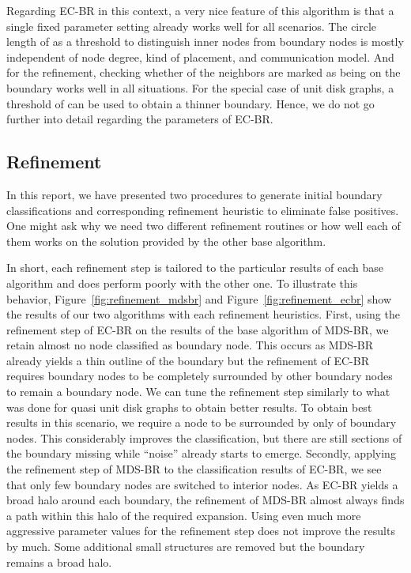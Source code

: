 \documentclass{llncs}
\begin{document}
Regarding EC-BR in this context, a very nice feature of this algorithm is that a single fixed parameter setting already works well for all scenarios. The circle length of  as a threshold to distinguish inner nodes from boundary nodes is mostly independent of node degree, kind of placement, and communication model. And for the refinement, checking whether  of the neighbors are marked as being on the boundary works well in all situations. For the special case of unit disk graphs, a threshold of  can be used to obtain a thinner boundary. Hence, we do not go further into detail regarding the parameters of EC-BR.


\subsection{Refinement}
\label{sec::sim::refinement}
In this report, we have presented two procedures to generate initial boundary classifications and corresponding refinement heuristic to eliminate false positives.
One might ask why we need two different refinement routines or how well each of them works on the solution provided by the other base algorithm.

In short, each refinement step is tailored to the particular results of each base algorithm and does perform poorly with the other one.
To illustrate this behavior, Figure~\ref{fig:refinement_mdsbr} and Figure~\ref{fig:refinement_ecbr} show the results of our two algorithms with each refinement heuristics.
First, using the refinement step of EC-BR on the results of the base algorithm of MDS-BR, we retain almost no node classified as boundary node.
This occurs as MDS-BR already yields a thin outline of the boundary but the refinement of EC-BR requires boundary nodes to be completely surrounded by other boundary nodes to remain a boundary node.
We can tune the refinement step similarly to what was done for quasi unit disk graphs to obtain better results.
To obtain best results in this scenario, we require a node to be surrounded by only  of boundary nodes.
This considerably improves the classification, but there are still sections of the boundary missing while ``noise'' already starts to emerge.
Secondly, applying the refinement step of MDS-BR to the classification results of EC-BR, we see that only few boundary nodes are switched to interior nodes.
As EC-BR yields a broad halo around each boundary, the refinement of MDS-BR almost always finds a path within this halo of the required expansion.
Using even much more aggressive parameter values for the refinement step does not improve the results by much.
Some additional small structures are removed but the boundary remains a broad halo.
\end{document}
